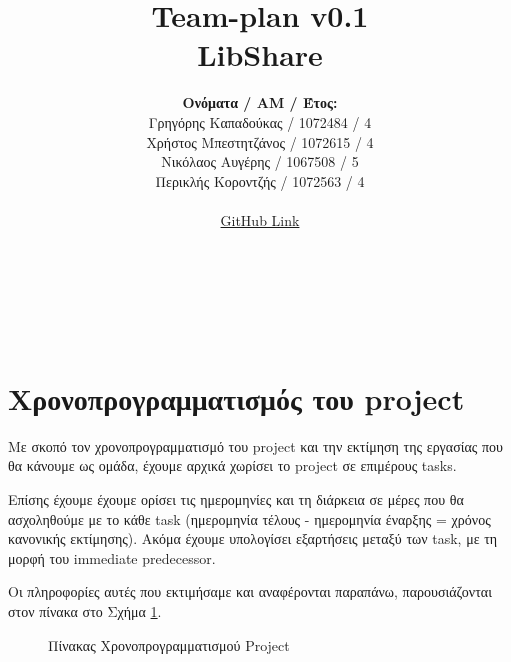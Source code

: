 \documentclass[12pt,a4paper]{article}
\title{Team-plan v0.1 \\ LibShare}
\author{\textbf{Ονόματα / ΑΜ / Έτος:} \\ Γρηγόρης Καπαδούκας / 1072484 / 4\textdegree \\ Χρήστος Μπεστητζάνος / 1072615 / 4\textdegree \\ Νικόλαος Αυγέρης / 1067508 / 5\textdegree \\ Περικλής Κοροντζής / 1072563 / 4\textdegree\\ \\ \href{https://github.com/GregKapadoukas/University-Software-Engineering-Project}{GitHub Link}}
\begin{document}
\makeatletter
\begin{center}
	\LARGE{\@title} \\
	\pagebreak
\end{center}
\begin{LARGE}\@author\end{LARGE} \\
\pagebreak

\section{Χρονοπρογραμματισμός του project}
Με σκοπό τον χρονοπρογραμματισμό του project και την εκτίμηση της εργασίας που θα κάνουμε ως ομάδα, έχουμε αρχικά χωρίσει το project σε επιμέρους tasks.

Επίσης έχουμε έχουμε ορίσει τις ημερομηνίες και τη διάρκεια σε μέρες που θα ασχοληθούμε με το κάθε task (ημερομηνία τέλους - ημερομηνία έναρξης = χρόνος κανονικής εκτίμησης). Ακόμα έχουμε υπολογίσει εξαρτήσεις μεταξύ των task, με τη μορφή του immediate predecessor.

Οι πληροφορίες αυτές που εκτιμήσαμε και αναφέρονται παραπάνω, παρουσιάζονται στον πίνακα στο Σχήμα \ref{Πίνακας Χρονοπρογραμματισμού Project}.

\begin{figure}[H]
	\caption{Πίνακας Χρονοπρογραμματισμού Project}
	\label{Πίνακας Χρονοπρογραμματισμού Project}
\end{figure}
\end{document}
